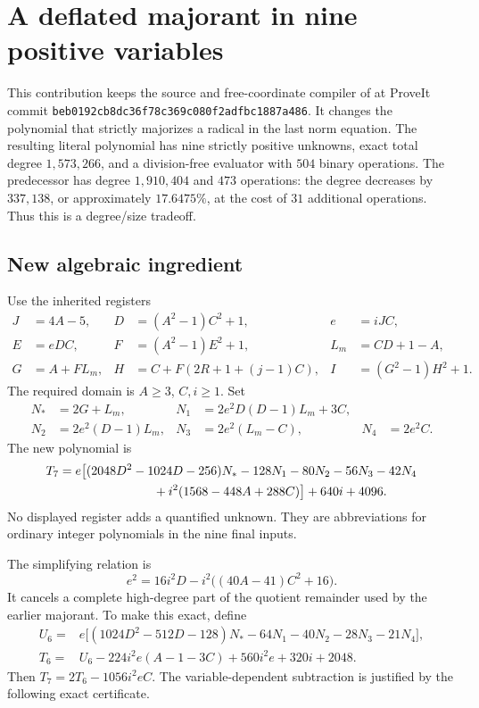 \section{A deflated majorant in nine positive variables}
\label{sec:deflated-nine}

This contribution keeps the source and free-coordinate compiler of
 at ProveIt commit
\texttt{beb0192cb8dc36f78c369c080f2adfbc1887a486}.
It changes the polynomial that strictly majorizes a radical in the last
norm equation.  The resulting literal polynomial has nine strictly positive
unknowns, exact total degree \(1{,}573{,}266\), and a division-free evaluator
with \(504\) binary operations.  The predecessor has degree
\(1{,}910{,}404\) and \(473\) operations: the degree decreases by
\(337{,}138\), or approximately \(17.6475\%\), at the cost of \(31\)
additional operations.  Thus this is a degree/size tradeoff.

\subsection{New algebraic ingredient}

Use the inherited registers
\begin{align*}
 J&=4A-5,&D&=(A^2-1)C^2+1,&e&=iJC,\\
 E&=eDC,&F&=(A^2-1)E^2+1,&L_m&=CD+1-A,\\
 G&=A+FL_m,&H&=C+F(2R+1+(j-1)C),&I&=(G^2-1)H^2+1.
\end{align*}
The required domain is \(A\geq3\), \(C,i\geq1\).  Set
\begin{align*}
 N_*&=2G+L_m,&N_1&=2e^2D(D-1)L_m+3C,\\
 N_2&=2e^2(D-1)L_m,&N_3&=2e^2(L_m-C),&N_4&=2e^2C.
\end{align*}
The new polynomial is
\begin{align}
 T_7={}&e\bigl[(2048D^2-1024D-256)N_*
       -128N_1-80N_2-56N_3-42N_4 \notag\\
       &\hspace{22mm}+i^2(1568-448A+288C)\bigr]+640i+4096.
       \label{eq:deflated-T7}
\end{align}
No displayed register adds a quantified unknown.  They are abbreviations
for ordinary integer polynomials in the nine final inputs.

The simplifying relation is
\[
 e^2=16i^2D-i^2\bigl((40A-41)C^2+16\bigr).
\]
It cancels a complete high-degree part of the quotient remainder used by
the earlier majorant.  To make this exact, define
\begin{align*}
 U_6={}&e\bigl[(1024D^2-512D-128)N_*
             -64N_1-40N_2-28N_3-21N_4\bigr],\\
 T_6={}&U_6-224i^2e(A-1-3C)+560i^2e+320i+2048.
\end{align*}
Then \(T_7=2T_6-1056i^2eC\).  The variable-dependent subtraction is
justified by the following exact certificate.

